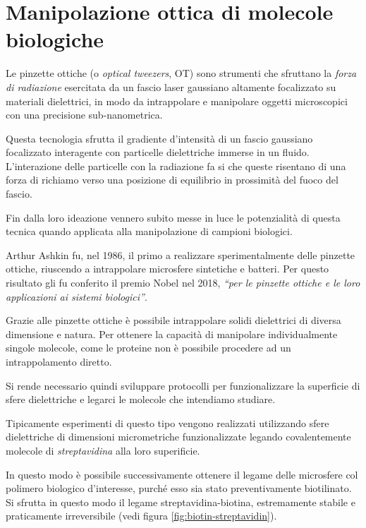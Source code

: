 \section{Manipolazione ottica di molecole biologiche}
\label{sec:ot}

Le pinzette ottiche (o \textit{optical tweezers}, OT) sono strumenti
che sfruttano la \emph{forza di radiazione} esercitata da un fascio
laser gaussiano altamente focalizzato su materiali dielettrici, in
modo da intrappolare e manipolare oggetti microscopici con una
precisione sub-nanometrica.

Questa tecnologia sfrutta il gradiente d'intensità di un fascio
gaussiano focalizzato interagente con particelle dielettriche immerse
in un fluido. L'interazione delle particelle con la radiazione fa si
che queste risentano di una forza di richiamo verso una posizione
di equilibrio in prossimità del fuoco del fascio.

Fin dalla loro ideazione vennero subito messe in luce le potenzialità
di questa tecnica quando applicata alla manipolazione di campioni
biologici.

Arthur Ashkin fu, nel 1986, il primo a realizzare sperimentalmente
delle pinzette ottiche, riuscendo a intrappolare microsfere sintetiche
e batteri\cite{Ashkin:86}. Per questo risultato gli fu conferito il
premio Nobel nel 2018, \emph{``per le pinzette ottiche e le loro
applicazioni ai sistemi biologici''}.

Grazie alle pinzette ottiche è possibile intrappolare solidi
dielettrici di diversa dimensione e natura.
Per ottenere la capacità di manipolare individualmente singole
molecole, come le proteine non è possibile procedere ad un
intrappolamento diretto.

Si rende necessario quindi sviluppare protocolli per funzionalizzare
la superficie di sfere dielettriche e legarci le molecole che
intendiamo studiare.

Tipicamente esperimenti di questo tipo vengono realizzati utilizzando
sfere dielettriche di dimensioni micrometriche funzionalizzate legando
covalentemente molecole di \textit{streptavidina} alla loro
superificie.

In questo modo è possibile successivamente ottenere il legame delle
microsfere col polimero biologico d'interesse, purché esso sia stato
preventivamente biotilinato. Si sfrutta in questo modo il legame 
streptavidina-biotina, estremamente stabile e praticamente
irreversibile (vedi figura \ref{fig:biotin-streptavidin}).

